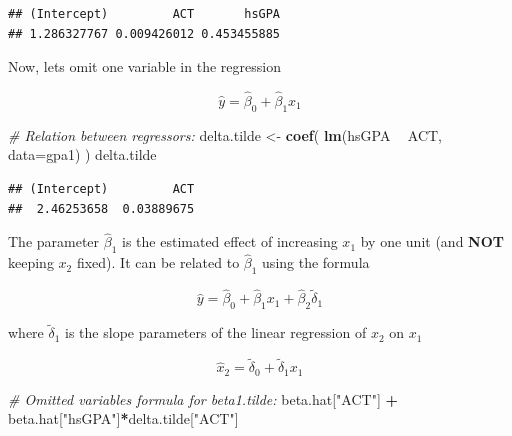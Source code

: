 \documentclass[]{book}
\newenvironment{Shaded}{\begin{snugshade}}{\end{snugshade}}
\newcommand{\CommentTok}[1]{\textcolor[rgb]{0.56,0.35,0.01}{\textit{#1}}}
\newcommand{\DataTypeTok}[1]{\textcolor[rgb]{0.13,0.29,0.53}{#1}}
\newcommand{\KeywordTok}[1]{\textcolor[rgb]{0.13,0.29,0.53}{\textbf{#1}}}
\newcommand{\NormalTok}[1]{#1}
\newcommand{\OperatorTok}[1]{\textcolor[rgb]{0.81,0.36,0.00}{\textbf{#1}}}
\newcommand{\StringTok}[1]{\textcolor[rgb]{0.31,0.60,0.02}{#1}}
\begin{document}
\begin{verbatim}
## (Intercept)         ACT       hsGPA 
## 1.286327767 0.009426012 0.453455885
\end{verbatim}

Now, lets omit one variable in the regression

\begin{equation}
\hat{y} = \hat{\beta}_{0} + \hat{\beta}_{1}x_{1}    
\label{eq:lmomitted}
\end{equation}

\begin{Shaded}
\begin{Highlighting}[]
\CommentTok{# Relation between regressors:}
\NormalTok{delta.tilde <-}\StringTok{ }\KeywordTok{coef}\NormalTok{( }\KeywordTok{lm}\NormalTok{(hsGPA }\OperatorTok{~}\StringTok{ }\NormalTok{ACT, }\DataTypeTok{data=}\NormalTok{gpa1) )}
\NormalTok{delta.tilde}
\end{Highlighting}
\end{Shaded}

\begin{verbatim}
## (Intercept)         ACT 
##  2.46253658  0.03889675
\end{verbatim}

The parameter \(\hat\beta_1\) is the estimated effect of increasing \(x_1\) by one unit (and \textbf{NOT} keeping \(x_2\) fixed). It can be related to \(\hat\beta_1\) using the formula

\begin{equation}
\hat{y} = \hat{\beta}_{0} + \hat{\beta}_{1} x_{1} +  \hat{\beta}_{2}  \tilde\delta_{1}
\label{eq:lmommited}
\end{equation}

where \(\tilde\delta_{1}\) is the slope parameters of the linear regression of \(x_2\) on \(x_1\)

\begin{equation}
\hat{x}_2 = \tilde\delta_{0} + \tilde\delta_{1} x_{1}
\label{eq:lmomitted2}
\end{equation}

\begin{Shaded}
\begin{Highlighting}[]
\CommentTok{# Omitted variables formula for beta1.tilde:}
\NormalTok{beta.hat[}\StringTok{"ACT"}\NormalTok{] }\OperatorTok{+}\StringTok{ }\NormalTok{beta.hat[}\StringTok{"hsGPA"}\NormalTok{]}\OperatorTok{*}\NormalTok{delta.tilde[}\StringTok{"ACT"}\NormalTok{]}
\end{Highlighting}
\end{Shaded}
\end{document}
